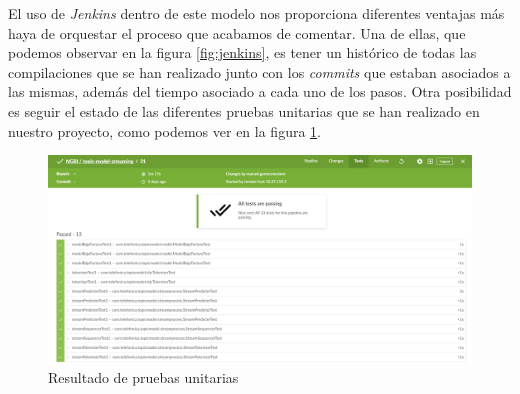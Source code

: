  


El uso de \textit{Jenkins} dentro de este modelo nos proporciona diferentes ventajas más haya de orquestar el proceso que acabamos de comentar. Una de ellas, que podemos observar en la figura \ref{fig:jenkins}, es tener un histórico de todas las compilaciones que se han realizado junto con los \textit{commits} que estaban asociados a las mismas, además del tiempo asociado a cada uno de los pasos.  Otra posibilidad es seguir el estado de las diferentes pruebas unitarias que se han realizado en nuestro proyecto, como podemos ver en la figura \ref{fig:jenkins-tests}.



\begin{figure}[!ht]
	\centering
	\includegraphics[width=1\textwidth]{images/mant/tests_v2}
	\caption{Resultado de pruebas unitarias}
	\label{fig:jenkins-tests}
\end{figure}

